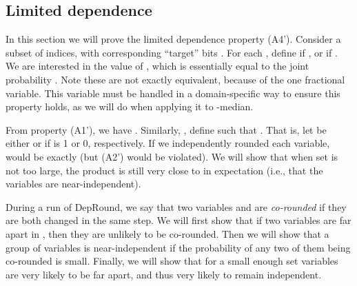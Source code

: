 \subsection{Limited dependence} 
In this section we will prove the limited dependence property (A4').  Consider a subset  of  indices, with corresponding ``target'' bits .  For each , define  if , or  if . We are interested in the value of , which is essentially equal to the joint probability . Note these are not exactly equivalent, because of the one fractional variable. This variable must be handled in a domain-specific way to ensure this property holds, as we will do when applying it to -median.

From property (A1'), we have . Similarly, , define  such that . That is, let  be either  or  if  is 1 or 0, respectively. If we independently rounded each variable,  would be exactly  (but (A2') would be violated). We will show that when set  is not too large, the product is still very close to  in expectation (i.e., that the variables  are near-independent). 

During a run of {\sc DepRound}, we say that two variables  and  are \emph{co-rounded} if they are both changed in the same step. We will first show that if two variables are far apart in , then they are unlikely to be co-rounded. Then we will show that a group of variables is near-independent if the probability of any two of them being co-rounded is small. Finally, we will show that for a small enough set  variables are very likely to be far apart, and thus very likely to remain independent.

